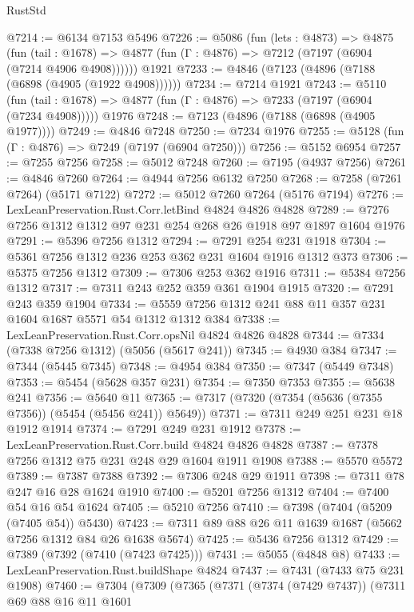 \begin{lexlean}{RustStd}
\begin{coremodule}
@7214 := @6134 @7153 @5496
@7226 := @5086
    (fun (lets : @4873) =>
    @4875
      (fun (tail : @1678) => @4877 (fun (Γ : @4876) => @7212 (@7197 (@6904 (@7214 @4906 @4908))))))
    @1921
@7233 := @4846 (@7123 (@4896 (@7188 (@6898 (@4905 (@1922 @4908))))))
@7234 := @7214 @1921
@7243 := @5110
    (fun (tail : @1678) => @4877 (fun (Γ : @4876) => @7233 (@7197 (@6904 (@7234 @4908)))))
    @1976
@7248 := @7123 (@4896 (@7188 (@6898 (@4905 @1977))))
@7249 := @4846 @7248
@7250 := @7234 @1976
@7255 := @5128 (fun (Γ : @4876) => @7249 (@7197 (@6904 @7250)))
@7256 := @5152 @6954
@7257 := @7255 @7256
@7258 := @5012 @7248
@7260 := @7195 (@4937 @7256)
@7261 := @4846 @7260
@7264 := @4944 @7256 @6132 @7250
@7268 := @7258 (@7261 @7264) (@5171 @7122)
@7272 := @5012 @7260 @7264 (@5176 @7194)
@7276 := LexLeanPreservation.Rust.Corr.letBind @4824 @4826 @4828
@7289 := @7276 @7256 @1312 @1312 @97 @231 @254 @268 @26 @1918 @97 @1897 @1604 @1976
@7291 := @5396 @7256 @1312
@7294 := @7291 @254 @231 @1918
@7304 := @5361 @7256 @1312 @236 @253 @362 @231 @1604 @1916 @1312 @373
@7306 := @5375 @7256 @1312
@7309 := @7306 @253 @362 @1916
@7311 := @5384 @7256 @1312
@7317 := @7311 @243 @252 @359 @361 @1904 @1915
@7320 := @7291 @243 @359 @1904
@7334 := @5559 @7256 @1312 @241 @88 @11 @357 @231 @1604 @1687 @5571 @54 @1312 @1312 @384
@7338 := LexLeanPreservation.Rust.Corr.opsNil @4824 @4826 @4828
@7344 := @7334 (@7338 @7256 @1312) (@5056 (@5617 @241))
@7345 := @4930 @384
@7347 := @7344 (@5445 @7345)
@7348 := @4954 @384
@7350 := @7347 (@5449 @7348)
@7353 := @5454 (@5628 @357 @231)
@7354 := @7350 @7353
@7355 := @5638 @241
@7356 := @5640 @11
@7365 := @7317 (@7320 (@7354 (@5636 (@7355 @7356)) (@5454 (@5456 @241)) @5649))
@7371 := @7311 @249 @251 @231 @18 @1912 @1914
@7374 := @7291 @249 @231 @1912
@7378 := LexLeanPreservation.Rust.Corr.build @4824 @4826 @4828
@7387 := @7378 @7256 @1312 @75 @231 @248 @29 @1604 @1911 @1908
@7388 := @5570 @5572
@7389 := @7387 @7388
@7392 := @7306 @248 @29 @1911
@7398 := @7311 @78 @247 @16 @28 @1624 @1910
@7400 := @5201 @7256 @1312
@7404 := @7400 @54 @16 @54 @1624
@7405 := @5210 @7256
@7410 := @7398 (@7404 (@5209 (@7405 @54)) @5430)
@7423 := @7311 @89 @88 @26 @11 @1639 @1687 (@5662 @7256 @1312 @84 @26 @1638 @5674)
@7425 := @5436 @7256 @1312
@7429 := @7389 (@7392 (@7410 (@7423 @7425)))
@7431 := @5055 (@4848 @8)
@7433 := LexLeanPreservation.Rust.buildShape @4824
@7437 := @7431 (@7433 @75 @231 @1908)
@7460 := @7304
    (@7309
      (@7365
        (@7371
          (@7374 (@7429 @7437))
          (@7311
            @69
            @88
            @16
            @11
            @1601

\end{coremodule}
\end{lexlean}
